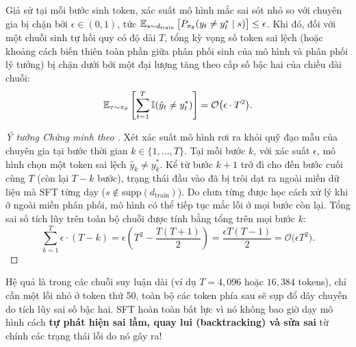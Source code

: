 \begin{theorem}
\label{thm:exposure_bias}
Giả sử tại mỗi bước sinh token, xác suất mô hình mắc sai sót nhỏ so với chuyên gia bị chặn bởi $\epsilon \in (0, 1)$, tức $\operatorname{\mathbb{E}}_{s \sim d_{\text{train}}} \big[ P_{\pi_\theta}(y_t \neq y_t^* \mid s) \big] \le \epsilon$.
Khi đó, đối với một chuỗi sinh tự hồi quy có độ dài $T$, tổng kỳ vọng số token sai lệch (hoặc khoảng cách biến thiên toàn phần giữa phân phối sinh của mô hình và phân phối lý tưởng) bị chặn dưới bởi một đại lượng tăng theo cấp số bậc hai của chiều dài chuỗi:
\begin{equation}
    \operatorname{\mathbb{E}}_{\tau \sim \pi_\theta} \left[ \sum_{t=1}^{T} \mathbb{I}(\hat{y}_t \neq y_t^*) \right] = \mathcal{O}\big(\epsilon \cdot T^2\big).
\end{equation}
\end{theorem}

\begin{proof}[Ý tưởng Chứng minh theo \citet{ross2011reduction}]
Xét xác suất mô hình rơi ra khỏi quỹ đạo mẫu của chuyên gia tại bước thời gian $k \in \{1, \dots, T\}$. Tại mỗi bước $k$, với xác suất $\epsilon$, mô hình chọn một token sai lệch $\hat{y}_k \neq y_k^*$.
Kể từ bước $k+1$ trở đi cho đến bước cuối cùng $T$ (còn lại $T - k$ bước), trạng thái đầu vào đã bị trôi dạt ra ngoài miền dữ liệu mà SFT từng dạy ($s \notin \text{supp}(d_{\text{train}})$). Do chưa từng được học cách xử lý khi ở ngoài miền phân phối, mô hình có thể tiếp tục mắc lỗi ở mọi bước còn lại.
Tổng sai số tích lũy trên toàn bộ chuỗi được tính bằng tổng trên mọi bước $k$:
\begin{equation}
    \sum_{k=1}^{T} \epsilon \cdot (T - k) = \epsilon \left( T^2 - \frac{T(T+1)}{2} \right) = \frac{\epsilon T(T-1)}{2} = \mathcal{O}\big(\epsilon T^2\big).
\end{equation}
\end{proof}

Hệ quả là trong các chuỗi suy luận dài (ví dụ $T = 4,096$ hoặc $16,384$ tokens), chỉ cần một lỗi nhỏ ở token thứ 50, toàn bộ các token phía sau sẽ sụp đổ dây chuyền do tích lũy sai số bậc hai. SFT hoàn toàn bất lực vì nó không bao giờ dạy mô hình cách \textbf{tự phát hiện sai lầm, quay lui (backtracking) và sửa sai} từ chính các trạng thái lỗi do nó gây ra!

